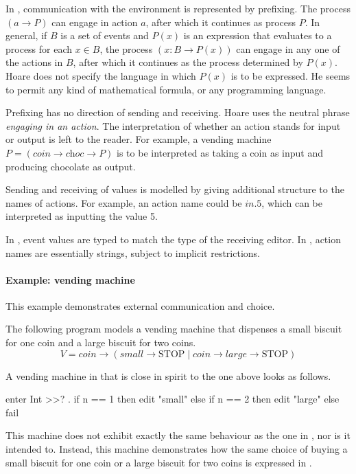 In \CSP, communication with the environment is represented by prefixing.
The process $(a \to P)$ can engage in action $a$, after which it continues as process $P$.
In general, if $B$ is a set of events and $P(x)$ is an expression that evaluates to a process for each $x \in B$, the process $(x:B \to P(x))$ can engage in any one of the actions in $B$, after which it continues as the process determined by $P(x)$.
Hoare does not specify the language in which $P(x)$ is to be expressed.
He seems to permit any kind of mathematical formula, or any programming language.

Prefixing has no direction of sending and receiving.
Hoare uses the neutral phrase \emph{engaging in an action}.
The interpretation of whether an action stands for input or output is left to the reader.
For example, a vending machine $P = (\textit{coin} \to \textit{choc} \to P)$ is to be interpreted as taking a coin as input and producing chocolate as output.

Sending and receiving of values is modelled by giving additional structure to the names of actions.
For example, an action name could be $\textit{in}.5$, which can be interpreted as inputting the value 5.

In \TOP, event values are typed to match the type of the receiving editor.
In \CSP, action names are essentially strings, subject to implicit restrictions.


\paragraph{Example: vending machine}

This example demonstrates external communication and choice.

The following \CSP program models a vending machine that dispenses a small biscuit for one coin and a large biscuit for two coins. $$V = \textit{coin} \to (\textit{small} \to \text{STOP} \mid \textit{coin} \to \textit{large} \to \text{STOP})$$

A vending machine in \TOP that is close in spirit to the one above looks as follows.
\begin{TASK}
  enter Int >>? \n. if n == 1 then edit "small"
    else if n == 2 then edit "large" else fail
\end{TASK}
This machine does not exhibit exactly the same behaviour as the one in \CSP, nor is it intended to.
Instead, this machine demonstrates how the same choice of buying a small biscuit for one coin or a large biscuit for two coins is expressed in \TOP.

